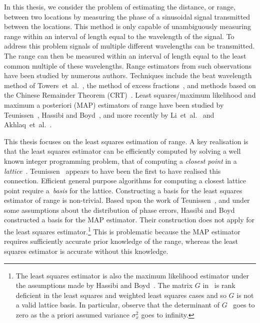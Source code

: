 In this thesis, we consider the problem of estimating the distance, or range, between two locations by measuring the phase of a sinusoidal signal transmitted between the locations. This method is only capable of unambiguously measuring range within an interval of length equal to the wavelength of the signal. To address this problem signals of multiple different wavelengths can be transmitted.  The range can then be measured within an interval of length equal to the least common multiple of these wavelengths. Range estimators from such observations have been studied by numerous authors.  Techniques include the beat wavelength method of Towers~et~al.~\cite{Towers_frequency_selection_interferometry_2003,Towers:04_generalised_frequency_selection}, the method of excess fractions~\cite{Falaggis_excess_fractions_2011,Falaggis_excess_fractions_2012,Falaggis_excess_fractions_2013,Falaggis_algebraic_solution_2014}, and methods based on the Chinese Remainder Theorem (CRT)~\cite{Oystein_Ore_general_chinese_Remainder_1952, Oded_Chinese_remaindering_with_errors_2000, Xia_generalised_CRT_2005, Xia2007, XWLi2008, W.Wang_closed_form_crt_2010, YangBin_range_estimation_with_CRT_2014, Xiao_multistage_crt_2014}.  Least squares/maximum likelihood and maximum a posteriori (MAP) estimators of range have been studied by Teunissen~\cite{Teunissen_GPS_1995}, Hassibi and Boyd~\cite{Hassibi_GPS_1998}, and more recently by Li~et~al.~\cite{Li_distance_est_wrapped_phase} and Akhlaq~et~al.~\cite{Akhlaq_basis_construction_range_est_2015}.  

This thesis focuses on the least squares estimation of range. A key realisation is that the least squares estimator can be efficiently computed by solving a well known integer programming problem, that of computing a \emph{closest point} in a \emph{lattice}~\cite{Agrell2002}.  Teunissen~\cite{Teunissen_GPS_1995} appears to have been the first to have realised this connection. Efficient general purpose algorithms for computing a closest lattice point require a~\emph{basis} for the lattice.  Constructing a basis for the least squares estimator of range is non-trivial.  Based upon the work of Teunissen~\cite{Teunissen_GPS_1995}, and under some assumptions about the distribution of phase errors, Hassibi and Boyd~\cite{Hassibi_GPS_1998} constructed a basis for the MAP estimator.  Their construction does not apply for the least squares estimator.\footnote{The least squares estimator is also the maximum likelihood estimator under the assumptions made by Hassibi and Boyd~\cite{Hassibi_GPS_1998}.  The matrix $G$ in~\cite{Hassibi_GPS_1998} is rank deficient in the least squares and weighted least squares cases and so $G$ is not a valid lattice basis.  In particular, observe that the determinant of $G$~\cite[p.~2948]{Hassibi_GPS_1998} goes to zero as the a priori assumed variance $\sigma_x^2$ goes to infinity.}  This is problematic because the MAP estimator requires sufficiently accurate prior knowledge of the range, whereas the least squares estimator is accurate without this knowledge.  

